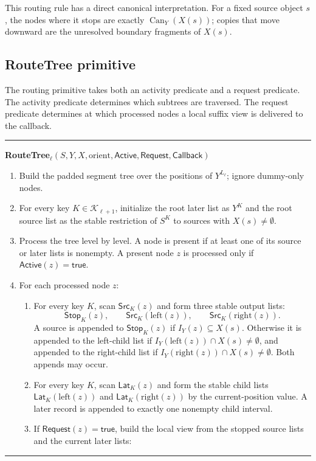 \documentclass[11pt]{article}
\newcommand{\Can}{\operatorname{Can}}
\newcommand{\Callback}{\ensuremath{\mathsf{Callback}}}
\newcommand{\Request}{\ensuremath{\mathsf{Request}}}
\newcommand{\Active}{\ensuremath{\mathsf{Active}}}
\newcommand{\Src}{\ensuremath{\mathsf{Src}}}
\newcommand{\Lat}{\ensuremath{\mathsf{Lat}}}
\newcommand{\Stop}{\ensuremath{\mathsf{Stop}}}
\newcommand{\true}{\ensuremath{\mathsf{true}}}
\theoremstyle{definition}
\newenvironment{algorithmbox}[1]{%
  \par\medskip\noindent\hrule\smallskip
  \noindent\textbf{#1}\par\smallskip
  \begin{enumerate}[leftmargin=1.7em,itemsep=2pt,topsep=2pt]
}{%
  \end{enumerate}
  \smallskip\hrule\medskip
}
\begin{document}
This routing rule has a direct canonical interpretation.  For a fixed source object $s$, the nodes where it stops are exactly $\Can_Y(X(s))$; copies that move downward are the unresolved boundary fragments of $X(s)$.

\subsection{RouteTree primitive}

The routing primitive takes both an activity predicate and a request predicate.  The activity predicate determines which subtrees are traversed.  The request predicate determines at which processed nodes a local suffix view is delivered to the callback.

\begin{algorithmbox}{RouteTree$_\ell(S,Y,X,\mathrm{orient},\Active,\Request,\Callback)$}
\item Build the padded segment tree over the positions of $Y^{L_\ell}$; ignore dummy-only nodes.
\item For every key $K\in\mathcal K_{\ell+1}$, initialize the root later list as $Y^K$ and the root source list as the stable restriction of $S^K$ to sources with $X(s)\ne\emptyset$.
\item Process the tree level by level.  A node is present if at least one of its source or later lists is nonempty.  A present node $z$ is processed only if $\Active(z)=\true$.
\item For each processed node $z$:
  \begin{enumerate}[leftmargin=1.5em,itemsep=1pt,topsep=1pt]
  \item For every key $K$, scan $\Src_K(z)$ and form three stable output lists:
  \[
    \Stop_K(z),\qquad \Src_K(\mathrm{left}(z)),\qquad \Src_K(\mathrm{right}(z)).
  \]
  A source is appended to $\Stop_K(z)$ if $I_Y(z)\subseteq X(s)$.  Otherwise it is appended to the left-child list if $I_Y(\mathrm{left}(z))\cap X(s)\ne\emptyset$, and appended to the right-child list if $I_Y(\mathrm{right}(z))\cap X(s)\ne\emptyset$.  Both appends may occur.
  \item For every key $K$, scan $\Lat_K(z)$ and form the stable child lists $\Lat_K(\mathrm{left}(z))$ and $\Lat_K(\mathrm{right}(z))$ by the current-position value.  A later record is appended to exactly one nonempty child interval.
  \item If $\Request(z)=\true$, build the local view from the stopped source lists and the current later lists:
    \begin{itemize}[leftmargin=1.5em,itemsep=1pt,topsep=1pt]

\end{itemize}
\end{enumerate}
\end{algorithmbox}
\end{document}
